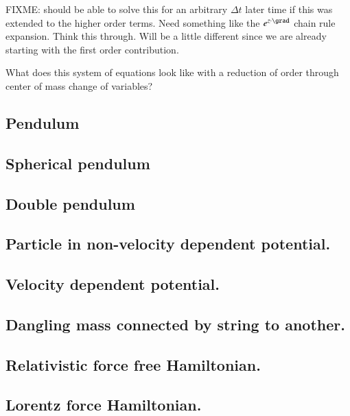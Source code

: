 FIXME: should be able to solve this for an arbitrary $\Delta t$ later time if this was extended to the higher order terms.  Need something like the $e^{z \cdot \grad}$ chain rule expansion.  Think this through.  Will be a little different since we are already starting with the first order contribution.

What does this system of equations look like with a reduction of order through center of mass change of variables?

\subsection{Pendulum}

\subsection{Spherical pendulum}

\subsection{Double pendulum}

\subsection{Particle in non-velocity dependent potential.}

\subsection{Velocity dependent potential.}

\subsection{Dangling mass connected by string to another.}

\subsection{Relativistic force free Hamiltonian.}

\subsection{Lorentz force Hamiltonian.}

\EndArticle
